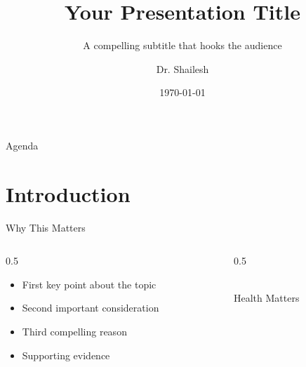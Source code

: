 \documentclass[aspectratio=169]{beamer}
\title{Your Presentation Title}
\subtitle{A compelling subtitle that hooks the audience}
\author{Dr. Shailesh}
\institute{Your Organization}
\date{\today}
\begin{document}
\begin{frame}[plain]
    \titlepage
\end{frame}

\begin{frame}{Agenda}
    \tableofcontents
\end{frame}

\section{Introduction}

\begin{frame}{Why This Matters}
    \begin{columns}
        \begin{column}{0.5\textwidth}
            \begin{itemize}
                \item First key point about the topic
                \item Second important consideration
                \item Third compelling reason
                \item Supporting evidence
            \end{itemize}
        \end{column}
        \begin{column}{0.5\textwidth}
            \begin{center}
                \textcolor{BrandPrimary}{\Huge\faHeartbeat}\\[1cm]
                \textcolor{BrandSecondary}{\Large Health Matters}
            \end{center}
        \end{column}
    \end{columns}
\end{frame}
\end{document}
